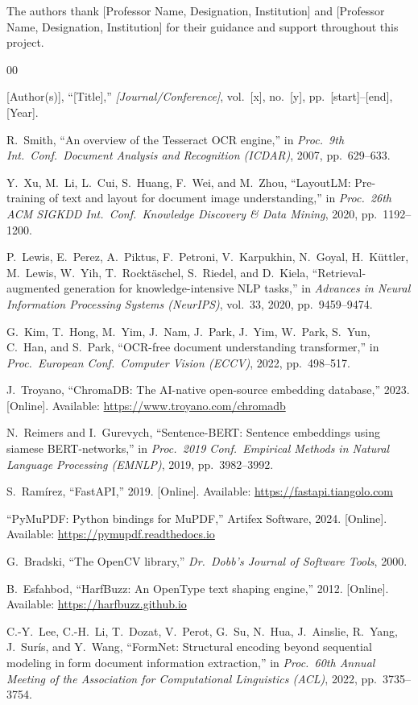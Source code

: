 \documentclass[conference]{IEEEtran}
\begin{document}
The authors thank [Professor Name, Designation, Institution] and [Professor Name, Designation, Institution] for their guidance and support throughout this project.

\begin{thebibliography}{00}

[Author(s)], ``[Title],'' \textit{[Journal/Conference]}, vol.~[x], no.~[y], pp.~[start]--[end], [Year].

R.\ Smith, ``An overview of the Tesseract OCR engine,'' in \textit{Proc.\ 9th Int.\ Conf.\ Document Analysis and Recognition (ICDAR)}, 2007, pp.~629--633.

Y.\ Xu, M.\ Li, L.\ Cui, S.\ Huang, F.\ Wei, and M.\ Zhou, ``LayoutLM: Pre-training of text and layout for document image understanding,'' in \textit{Proc.\ 26th ACM SIGKDD Int.\ Conf.\ Knowledge Discovery \& Data Mining}, 2020, pp.~1192--1200.

P.\ Lewis, E.\ Perez, A.\ Piktus, F.\ Petroni, V.\ Karpukhin, N.\ Goyal, H.\ Küttler, M.\ Lewis, W.\ Yih, T.\ Rocktäschel, S.\ Riedel, and D.\ Kiela, ``Retrieval-augmented generation for knowledge-intensive NLP tasks,'' in \textit{Advances in Neural Information Processing Systems (NeurIPS)}, vol.~33, 2020, pp.~9459--9474.

G.\ Kim, T.\ Hong, M.\ Yim, J.\ Nam, J.\ Park, J.\ Yim, W.\ Park, S.\ Yun, C.\ Han, and S.\ Park, ``OCR-free document understanding transformer,'' in \textit{Proc.\ European Conf.\ Computer Vision (ECCV)}, 2022, pp.~498--517.

J.\ Troyano, ``ChromaDB: The AI-native open-source embedding database,'' 2023. [Online]. Available: \url{https://www.troyano.com/chromadb}

N.\ Reimers and I.\ Gurevych, ``Sentence-BERT: Sentence embeddings using siamese BERT-networks,'' in \textit{Proc.\ 2019 Conf.\ Empirical Methods in Natural Language Processing (EMNLP)}, 2019, pp.~3982--3992.

S.\ Ramírez, ``FastAPI,'' 2019. [Online]. Available: \url{https://fastapi.tiangolo.com}

``PyMuPDF: Python bindings for MuPDF,'' Artifex Software, 2024. [Online]. Available: \url{https://pymupdf.readthedocs.io}

G.\ Bradski, ``The OpenCV library,'' \textit{Dr.\ Dobb's Journal of Software Tools}, 2000.

B.\ Esfahbod, ``HarfBuzz: An OpenType text shaping engine,'' 2012. [Online]. Available: \url{https://harfbuzz.github.io}

C.-Y.\ Lee, C.-H.\ Li, T.\ Dozat, V.\ Perot, G.\ Su, N.\ Hua, J.\ Ainslie, R.\ Yang, J.\ Surís, and Y.\ Wang, ``FormNet: Structural encoding beyond sequential modeling in form document information extraction,'' in \textit{Proc.\ 60th Annual Meeting of the Association for Computational Linguistics (ACL)}, 2022, pp.~3735--3754.

\end{thebibliography}
\end{document}
